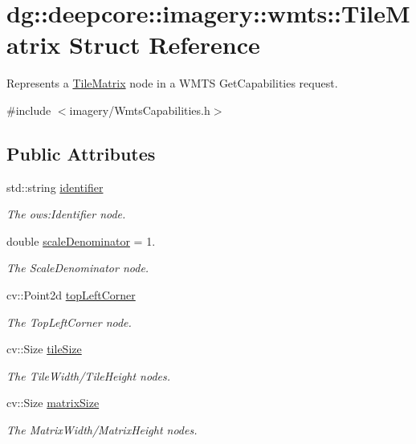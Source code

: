 \hypertarget{structdg_1_1deepcore_1_1imagery_1_1wmts_1_1_tile_matrix}{}\section{dg\+:\+:deepcore\+:\+:imagery\+:\+:wmts\+:\+:Tile\+Matrix Struct Reference}
\label{structdg_1_1deepcore_1_1imagery_1_1wmts_1_1_tile_matrix}


Represents a \hyperlink{structdg_1_1deepcore_1_1imagery_1_1wmts_1_1_tile_matrix}{Tile\+Matrix} node in a W\+M\+TS Get\+Capabilities request.  




{\ttfamily \#include $<$imagery/\+Wmts\+Capabilities.\+h$>$}

\subsection*{Public Attributes}
\begin{DoxyCompactItemize}
\item 
std\+::string \hyperlink{structdg_1_1deepcore_1_1imagery_1_1wmts_1_1_tile_matrix_a86b15e6a28c6ade6c2059d6c52473eaa}{identifier}
\begin{DoxyCompactList}\small\item\em The ows\+:Identifier node. \end{DoxyCompactList}\item 
double \hyperlink{structdg_1_1deepcore_1_1imagery_1_1wmts_1_1_tile_matrix_a111edc4eea402d1a9e40f60f0d673ece}{scale\+Denominator} = 1.
\begin{DoxyCompactList}\small\item\em The Scale\+Denominator node. \end{DoxyCompactList}\item 
cv\+::\+Point2d \hyperlink{structdg_1_1deepcore_1_1imagery_1_1wmts_1_1_tile_matrix_ac821a1a8a6db19c1a91f564b99fcc33f}{top\+Left\+Corner}
\begin{DoxyCompactList}\small\item\em The Top\+Left\+Corner node. \end{DoxyCompactList}\item 
cv\+::\+Size \hyperlink{structdg_1_1deepcore_1_1imagery_1_1wmts_1_1_tile_matrix_ace8dcd0a02171503108255096eac224f}{tile\+Size}
\begin{DoxyCompactList}\small\item\em The Tile\+Width/\+Tile\+Height nodes. \end{DoxyCompactList}\item 
cv\+::\+Size \hyperlink{structdg_1_1deepcore_1_1imagery_1_1wmts_1_1_tile_matrix_a2a8b014ac1759efe664e5f6b609182e4}{matrix\+Size}
\begin{DoxyCompactList}\small\item\em The Matrix\+Width/\+Matrix\+Height nodes. \end{DoxyCompactList}\end{DoxyCompactItemize}


